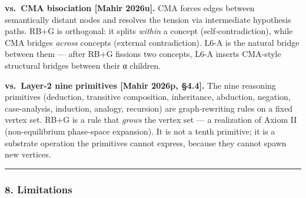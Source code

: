 \documentclass[
  11pt,
  a4paper,
]{article}
\begin{document}
\textbf{vs.~CMA bisociation {[}Mahir 2026u{]}.} CMA forces edges between
semantically distant nodes and resolves the tension via intermediate
hypothesis paths. RB+G is orthogonal: it splits \emph{within} a concept
(self-contradiction), while CMA bridges \emph{across} concepts (external
contradiction). L6-A is the natural bridge between them --- after RB+G
fissions two concepts, L6-A inserts CMA-style structural bridges between
their α children.

\textbf{vs.~Layer-2 nine primitives {[}Mahir 2026p, §4.4{]}.} The nine
reasoning primitives (deduction, transitive composition, inheritance,
abduction, negation, case-analysis, induction, analogy, recursion) are
graph-rewriting rules on a fixed vertex set. RB+G is a rule that
\emph{grows} the vertex set --- a realization of Axiom II
(non-equilibrium phase-space expansion). It is not a tenth primitive; it
is a substrate operation the primitives cannot express, because they
cannot spawn new vertices.

\begin{center}\rule{0.5\linewidth}{0.5pt}\end{center}

\subsubsection{8. Limitations}\label{limitations}
\end{document}
